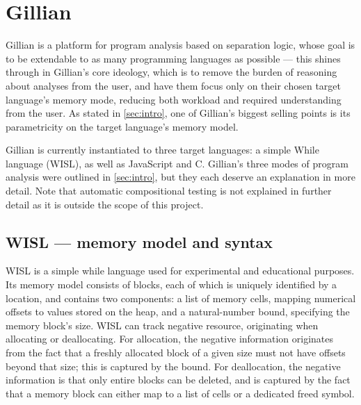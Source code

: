 \section{Gillian}\label{sec:background:gillian}

Gillian is a platform for program analysis based on separation logic, whose
goal is to be extendable to as many programming languages as possible --- this
shines through in Gillian's core ideology, which is to remove the burden of
reasoning about analyses from the user, and have them focus only on their
chosen target language's memory mode, reducing both workload and required
understanding from the user. As stated in \autoref{sec:intro}, one of
Gillian's biggest selling points is its parametricity on the target language's
memory model.

Gillian is currently instantiated to three target languages: a simple While
language (WISL), as well as JavaScript and C. Gillian's three modes of program
analysis were outlined in \autoref{sec:intro}, but they each deserve an
explanation in more detail. Note that automatic compositional testing is not
explained in further detail as it is outside the scope of this project.

\subsection{WISL --- memory model and syntax}
WISL is a simple while language used for experimental and educational purposes. Its memory model consists of blocks, each of which is uniquely identified by a location, and contains two components: a list of memory cells, mapping numerical offsets to values stored on the heap, and a natural-number bound, specifying the memory block's size.  WISL can track negative resource, originating when allocating or deallocating. For allocation, the negative information originates from the fact that a freshly allocated block of a given size must not have offsets beyond that size; this is captured by the bound. For deallocation, the negative information is that only entire blocks can be deleted, and is captured by the fact that a memory block can either map to a list of cells or a dedicated freed symbol.

